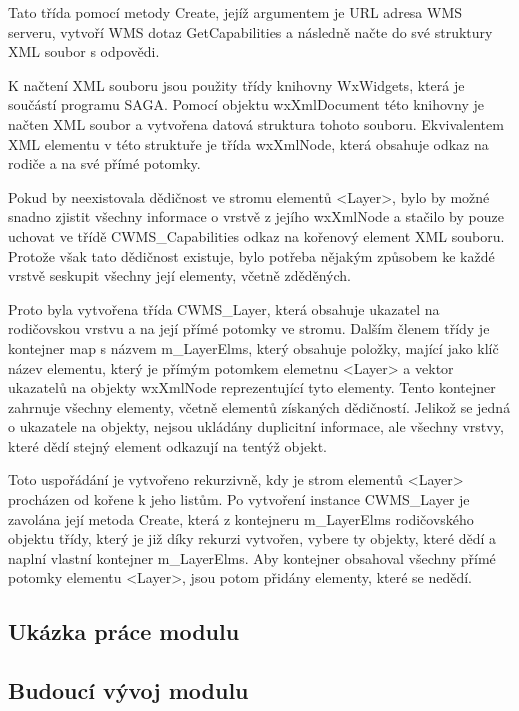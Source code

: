 \documentclass[a4paper,12pt]{article}
\begin{document}
Tato  třída pomocí metody Create, jejíž argumentem je URL adresa WMS serveru, vytvoří WMS dotaz GetCapabilities a následně načte do své struktury XML soubor s odpovědi.

K načtení XML souboru jsou použity třídy knihovny WxWidgets, která je součástí programu SAGA. Pomocí objektu wxXmlDocument této knihovny je načten XML soubor a vytvořena datová struktura tohoto souboru. Ekvivalentem XML elementu v této struktuře je třída wxXmlNode, která obsahuje odkaz na rodiče a na své přímé potomky. 

Pokud by neexistovala dědičnost ve stromu elementů <Layer>, bylo by možné snadno zjistit všechny informace o vrstvě z jejího wxXmlNode a stačilo by pouze uchovat ve třídě CWMS\_Capabilities odkaz na kořenový element XML souboru. Protože však tato dědičnost existuje, bylo potřeba nějakým způsobem ke každé vrstvě seskupit všechny její elementy, včetně zděděných. 
  

Proto byla vytvořena třída  CWMS\_Layer, která obsahuje ukazatel na rodičovskou vrstvu a na její přímé potomky ve stromu. Dalším členem třídy je kontejner map s názvem m\_LayerElms, který obsahuje položky, mající jako klíč název elementu, který je přímým potomkem elemetnu <Layer> a vektor ukazatelů na objekty wxXmlNode reprezentující tyto elementy. Tento kontejner zahrnuje všechny elementy, včetně elementů získaných dědičností. Jelikož se jedná o ukazatele na objekty, nejsou ukládány duplicitní informace, ale všechny vrstvy, které dědí stejný element odkazují na tentýž objekt. 

Toto uspořádání je vytvořeno rekurzivně, kdy je strom elementů <Layer> procházen od kořene k jeho listům. Po vytvoření instance  CWMS\_Layer je zavolána její metoda Create, která z kontejneru m\_LayerElms  rodičovského objektu třídy, který je již díky rekurzi vytvořen, vybere ty objekty, které dědí a naplní vlastní kontejner m\_LayerElms. Aby kontejner obsahoval všechny přímé potomky elementu <Layer>, jsou potom přidány elementy, které se nedědí. 

\subsection{Ukázka práce modulu}

\subsection{Budoucí vývoj modulu}
\end{document}
